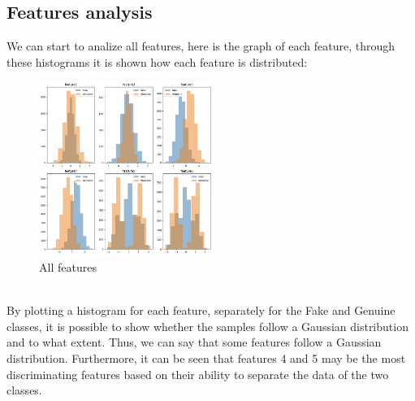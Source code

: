 \documentclass{article}
\begin{document}
\subsection{Features analysis}
We can start to analize all features, here is the graph of each feature, through these histograms it is shown how each feature is distributed:\\
\begin{figure}[ht]

        \centering
        \includegraphics[width=0.5\textwidth]{./img/AllFeatures.png}
        \caption{All features}
        \label{fig:AllFeatures}
\end{figure}  
\\
By plotting a histogram for each feature, separately for the Fake and Genuine classes, it is possible to show whether the samples follow a Gaussian distribution and to what extent. 
Thus, we can say that some features follow a Gaussian distribution. Furthermore, it can be seen that features 4 and 5 may be the most discriminating features based on their ability to separate the data of the two classes.\\
\end{document}
